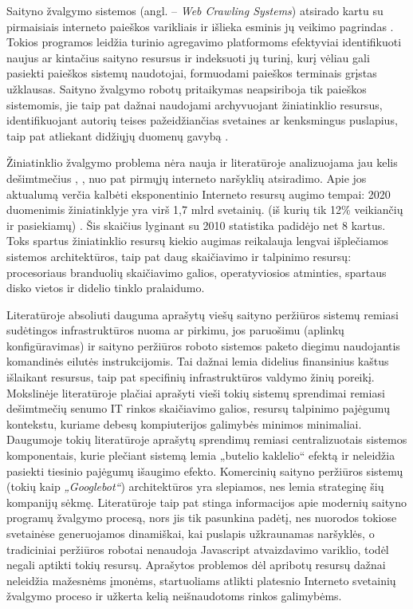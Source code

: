     Saityno žvalgymo sistemos (angl. -- \textit{Web Crawling Systems}) atsirado kartu su pirmaisiais interneto paieškos varikliais ir išlieka esminis jų veikimo pagrindas \cite{WCArchitectureMicrosoft}. Tokios programos leidžia turinio agregavimo platformoms efektyviai identifikuoti naujus ar kintačius saityno resursus ir indeksuoti jų turinį, kurį vėliau gali pasiekti paieškos sistemų naudotojai, formuodami paieškos terminais grįstas užklausas. Saityno žvalgymo robotų pritaikymas neapsiriboja tik paieškos sistemomis, jie taip pat dažnai naudojami archyvuojant žiniatinklio resursus, identifikuojant autorių teises pažeidžiančias svetaines ar kenksmingus puslapius, taip pat atliekant didžiųjų duomenų gavybą \cite{WCArchitectureMicrosoft}.
    
    
    Žiniatinklio žvalgymo problema nėra nauja ir literatūroje analizuojama jau kelis dešimtmečius \cite{EffectiveWebCrawling}, \cite{MercatorLiterature}, nuo pat pirmųjų interneto naršyklių atsiradimo. Apie jos aktualumą verčia kalbėti eksponentinio Interneto resursų augimo tempai: 2020 duomenimis žiniatinklyje yra virš 1,7 mlrd svetainių. (iš kurių tik 12\% veikiančių ir pasiekiamų) \cite{InternetLiveStats}. Šis skaičius lyginant su 2010 statistika padidėjo net 8 kartus. Toks spartus žiniatinklio resursų kiekio augimas reikalauja lengvai išplečiamos sistemos architektūros, taip pat daug skaičiavimo ir talpinimo resursų: procesoriaus branduolių skaičiavimo galios, operatyviosios atminties, spartaus disko vietos ir didelio tinklo pralaidumo.
    
    
    Literatūroje absoliuti dauguma aprašytų viešų saityno peržiūros sistemų remiasi sudėtingos infrastruktūros nuoma ar pirkimu, jos paruošimu (aplinkų konfigūravimas) ir saityno peržiūros roboto sistemos paketo diegimu naudojantis komandinės eilutės instrukcijomis. Tai dažnai lemia didelius finansinius kaštus išlaikant resursus, taip pat specifinių infrastruktūros valdymo žinių poreikį. Mokslinėje literatūroje plačiai aprašyti vieši tokių sistemų sprendimai remiasi dešimtmečių senumo IT rinkos skaičiavimo galios, resursų talpinimo pajėgumų kontekstu, kuriame debesų kompiuterijos galimybės minimos minimaliai. Daugumoje tokių literatūroje aprašytų sprendimų remiasi centralizuotais sistemos komponentais, kurie plečiant sistemą lemia „butelio kaklelio“ efektą ir neleidžia pasiekti tiesinio pajėgumų išaugimo efekto. Komercinių saityno peržiūros sistemų (tokių kaip \textit{„Googlebot“}) architektūros yra slepiamos, nes lemia strateginę šių kompanijų sėkmę. Literatūroje taip pat stinga informacijos apie modernių saityno programų žvalgymo procesą, nors jis tik pasunkina padėtį, nes nuorodos tokiose svetainėse generuojamos dinamiškai, kai puslapis užkraunamas naršyklės, o tradiciniai peržiūros robotai nenaudoja Javascript atvaizdavimo variklio, todėl negali aptikti tokių resursų. Aprašytos problemos dėl apribotų resursų dažnai neleidžia mažesnėms įmonėms, startuoliams atlikti platesnio Interneto svetainių žvalgymo proceso ir užkerta kelią neišnaudotoms rinkos galimybėms. 
    
